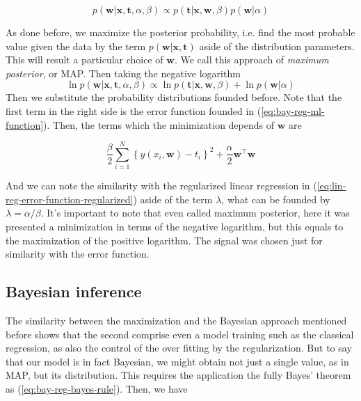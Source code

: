 \documentclass[11pt]{article} %
\begin{document}
\begin{equation}
   p(\mathbf{w} | \mathbf{x}, \mathbf{t}, \alpha, \beta) \propto p(\mathbf{t} | \mathbf{x}, \mathbf{w}, \beta) p(\mathbf{w} | \alpha)
\end{equation}

As done before, we maximize the posterior probability, i.e. find the most probable value given the data by the term $p(\mathbf{w} | \mathbf{x}, \mathbf{t}) $ aside of the distribution parameters. This will result a particular choice of $\mathbf{w}$. We call this approach of \textit{maximum posterior}, or MAP. Then taking the negative logarithm
%
\begin{equation}
   \ln p(\mathbf{w} | \mathbf{x}, \mathbf{t}, \alpha, \beta) \propto \ln p(\mathbf{t} | \mathbf{x}, \mathbf{w}, \beta) + \ln p(\mathbf{w} | \alpha)
\end{equation}
%
Then we substitute the probability distributions founded before. Note that the first term in the right side is the error function founded in (\ref{eq:bay-reg-ml-function}). Then, the terms which the minimization depends of $\mathbf{w}$ are

\begin{equation}
    \frac{\beta}{2} \sum_{i=1}^{N}\left\{y\left(x_{i}, \mathbf{w}\right)-t_{i}\right\}^{2} + \frac{\alpha}{2} \mathbf{w}^\top \mathbf{w}
\end{equation}

And we can note the similarity with the regularized linear regression in (\ref{eq:lin-reg-error-function-regularized}) aside of the term $\lambda$, what can be founded by $\lambda=\alpha / \beta$. It's important to note that even called maximum posterior, here it was presented a minimization in terms of the negative logarithm, but this equals to the maximization of the positive logarithm. The signal was chosen just for similarity with the error function.

\subsection{Bayesian inference}

The similarity between the maximization and the Bayesian approach mentioned before shows that the second comprise even a model training such as the classical regression, as also the control of the over fitting by the regularization. But to say that our model is in fact Bayesian, we might obtain not just a single value, as in MAP, but its distribution. This requires the application the fully Bayes' theorem as (\ref{eq:bay-reg-bayes-rule}). Then, we have
\end{document}

